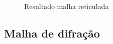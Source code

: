 \documentclass[10pt,a4paper]{article}
\begin{document}
\begin{figure}[h!]
\hspace{5mm}
\hspace{5mm}

\caption{Resultado malha reticulada}
\end{figure}


\subsection{Malha de difração}
\end{document}

